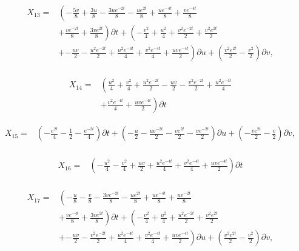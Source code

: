 \begin{align*}
X_{13}=&\left(- \frac{5 v}{8}+\frac{3 u}{8}- \frac{3 u e^{- 2 t}}{8}- \frac{u e^{2 t}}{8}+\frac{u e^{- 4 t}}{8}+\frac{v e^{- 4 t}}{8}\right.\\
&+\left.\frac{v e^{- 2 t}}{8}+\frac{3 v e^{2 t}}{8} \right)\partial t+\left(- \frac{v^{2}}{4}+\frac{u^{2}}{4}+\frac{v^{2} e^{- 2 t}}{2}+\frac{v^{2} e^{2 t}}{2}\right.\\
&+\left.- \frac{u v}{2}- \frac{u^{2} e^{- 2 t}}{2}+\frac{u^{2} e^{- 4 t}}{4}+\frac{v^{2} e^{- 4 t}}{4}+\frac{u v e^{- 4 t}}{2} \right)\partial u+\left(\frac{v^{2} e^{2 t}}{2} - \frac{v^{2}}{2} \right)\partial v,\\
\end{align*}

\begin{align*}
X_{14}=&\left(\frac{u^{2}}{4}+\frac{v^{2}}{4}+\frac{u^{2} e^{- 2 t}}{2}- \frac{u v}{2}- \frac{v^{2} e^{- 2 t}}{2}+\frac{u^{2} e^{- 4 t}}{4}\right.\\
&+\left.\frac{v^{2} e^{- 4 t}}{4}+\frac{u v e^{- 4 t}}{2} \right)\partial t
\end{align*}

\begin{align*}
X_{15}=&\left(- \frac{e^{2 t}}{4} - \frac{1}{2} - \frac{e^{- 2 t}}{4} \right)\partial t+\left(- \frac{u}{2} - \frac{u e^{- 2 t}}{2} - \frac{v e^{2 t}}{2} - \frac{v e^{- 2 t}}{2} \right)\partial u+\left(- \frac{v e^{2 t}}{2} - \frac{v}{2} \right)\partial v,\\
\end{align*}

\begin{align*}
X_{16}=&\left(- \frac{u^{2}}{4}- \frac{v^{2}}{4}+\frac{u v}{2}+\frac{u^{2} e^{- 4 t}}{4}+\frac{v^{2} e^{- 4 t}}{4}+\frac{u v e^{- 4 t}}{2} \right)\partial t\\
\end{align*}

\begin{align*}
X_{17}=&\left(- \frac{u}{8}- \frac{v}{8}- \frac{3 v e^{- 2 t}}{8}- \frac{u e^{2 t}}{8}+\frac{u e^{- 4 t}}{8}+\frac{u e^{- 2 t}}{8}\right.\\
&+\left.\frac{v e^{- 4 t}}{8}+\frac{3 v e^{2 t}}{8} \right)\partial t+\left(- \frac{v^{2}}{4}+\frac{u^{2}}{4}+\frac{u^{2} e^{- 2 t}}{2}+\frac{v^{2} e^{2 t}}{2}\right.\\
&+\left.- \frac{u v}{2}- \frac{v^{2} e^{- 2 t}}{2}+\frac{u^{2} e^{- 4 t}}{4}+\frac{v^{2} e^{- 4 t}}{4}+\frac{u v e^{- 4 t}}{2} \right)\partial u+\left(\frac{v^{2} e^{2 t}}{2} - \frac{v^{2}}{2} \right)\partial v,\\
\end{align*}


